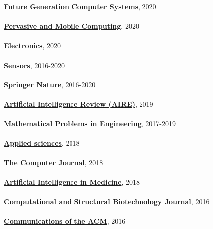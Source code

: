 \href{https://www.sciencedirect.com/journal/future-generation-computer-systems}{\textbf{Future Generation Computer Systems}}, 2020
\\ \halfblankline \\
\href{https://www.journals.elsevier.com/pervasive-and-mobile-computing}{\textbf{Pervasive and Mobile Computing}}, 2020
\\ \halfblankline \\
\href{https://www.mdpi.com/journal/electronics}{\textbf{Electronics}}, 2020
\\ \halfblankline \\
\href{http://www.mdpi.com/journal/sensors}{\textbf{Sensors}}, 2016-2020
\\ \halfblankline \\
\href{https://www.springernature.com/gp}{\textbf{Springer Nature}}, 2016-2020
\\ \halfblankline \\
\href{https://link.springer.com/journal/10462}{\textbf{Artificial Intelligence Review (AIRE)}}, 2019
\\ \halfblankline \\
\href{https://www.hindawi.com/journals/mpe/}{\textbf{Mathematical Problems in Engineering}}, 2017-2019
\\ \halfblankline \\
\href{http://www.mdpi.com/journal/applsci}{\textbf{Applied sciences}}, 2018
\\ \halfblankline \\
\href{https://academic.oup.com/comjnl}{\textbf{The Computer Journal}}, 2018
\\ \halfblankline \\
\href{https://www.journals.elsevier.com/artificial-intelligence-in-medicine/}{\textbf{Artificial Intelligence in Medicine}}, 2018
\\ \halfblankline \\
\href{https://www.journals.elsevier.com/computational-and-structural-biotechnology-journal/}{\textbf{Computational and Structural Biotechnology Journal}}, 2016
\\ \halfblankline \\
\href{http://cacm.acm.org/}{\textbf{Communications of the ACM}}, 2016
